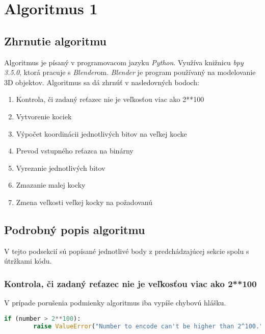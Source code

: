 \section{Algoritmus 1}
\subsection{Zhrnutie algoritmu}
Algoritmus je písaný v programovacom jazyku \textit{Python}. Využíva knižnicu \textit{bpy 3.5.0}, ktorá pracuje s \textit{Blender}om. \textit{Blender} je program používaný na modelovanie 3D objektov. Algoritmus sa dá zhrnúť v nasledovných bodoch:
\begin{enumerate}
    \item Kontrola, či zadaný reťazec nie je veľkosťou viac ako 2**100
    \item Vytvorenie kociek
    \item Výpočet koordinácii jednotlivých bitov na veľkej kocke
    \item Prevod vstupného reťazca na binárny 
    \item Vyrezanie jednotlivých bitov
    \item Zmazanie malej kocky
    \item Zmena veľkosti veľkej kocky na požadovanú
\end{enumerate}


\subsection{Podrobný popis algoritmu}
V tejto podsekcií sú popísané jednotlivé body z predchádzajúcej sekcie spolu s útržkami kódu.

\subsubsection{Kontrola, či zadaný reťazec nie je veľkosťou viac ako 2**100}
V prípade porušenia podmienky algoritmus iba vypíše chybovú hlášku.
\begin{lstlisting}[language=Python]
    if (number > 2**100):
        raise ValueError("Number to encode can't be higher than 2^100.")
\end{lstlisting}

